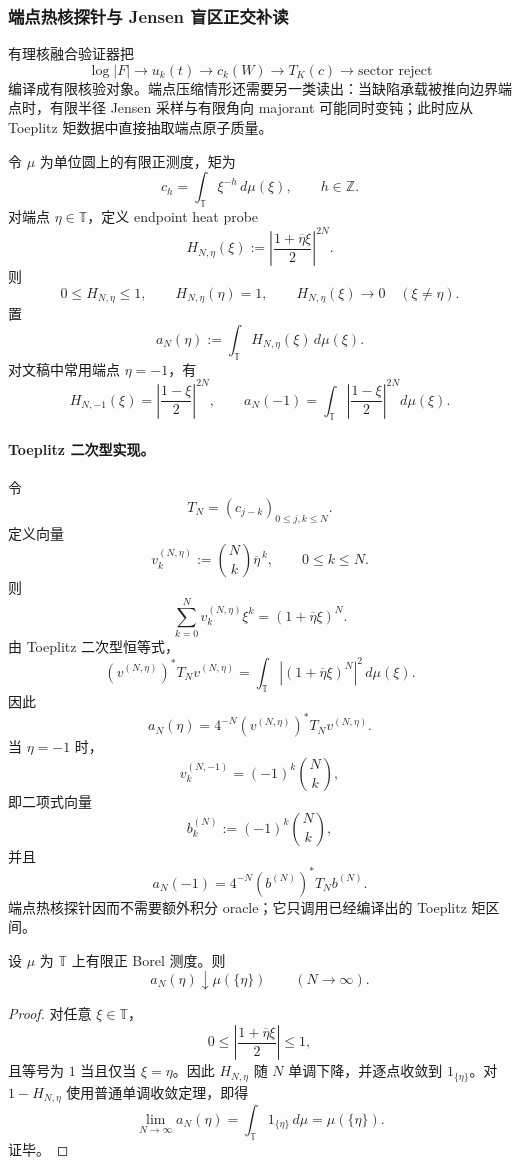 \subsubsection{端点热核探针与 Jensen 盲区正交补读}\label{subsubsec:typed-address-biaxial-completion-endpoint-heat-kernel-blindspot-complement}
有理核融合验证器把
\[
\log|F|
\longrightarrow
u_k(t)
\longrightarrow
c_k(W)
\longrightarrow
T_K(c)
\longrightarrow
\text{sector reject}
\]
编译成有限核验对象。端点压缩情形还需要另一类读出：当缺陷承载被推向边界端点时，有限半径 Jensen 采样与有限角向 majorant 可能同时变钝；此时应从 Toeplitz 矩数据中直接抽取端点原子质量。

令 \(\mu\) 为单位圆上的有限正测度，矩为
\[
c_h=\int_{\mathbb T}\xi^{-h}\,d\mu(\xi),
\qquad h\in\mathbb Z.
\]
对端点 \(\eta\in\mathbb T\)，定义 endpoint heat probe
\[
H_{N,\eta}(\xi)
:=
\left|
\frac{1+\overline{\eta}\xi}{2}
\right|^{2N}.
\]
则
\[
0\le H_{N,\eta}\le1,
\qquad
H_{N,\eta}(\eta)=1,
\qquad
H_{N,\eta}(\xi)\to0\quad(\xi\ne\eta).
\]
置
\[
a_N(\eta):=\int_{\mathbb T}H_{N,\eta}(\xi)\,d\mu(\xi).
\]
对文稿中常用端点 \(\eta=-1\)，有
\[
H_{N,-1}(\xi)
=
\left|\frac{1-\xi}{2}\right|^{2N},
\qquad
a_N(-1)
=
\int_{\mathbb T}
\left|\frac{1-\xi}{2}\right|^{2N}
d\mu(\xi).
\]

\paragraph{Toeplitz 二次型实现。}
令
\[
T_N=(c_{j-k})_{0\le j,k\le N}.
\]
定义向量
\[
v^{(N,\eta)}_k
:=
\binom Nk\overline{\eta}^{\,k},
\qquad 0\le k\le N.
\]
则
\[
\sum_{k=0}^N v^{(N,\eta)}_k\xi^k
=
(1+\overline{\eta}\xi)^N.
\]
由 Toeplitz 二次型恒等式，
\[
\left(v^{(N,\eta)}\right)^*T_Nv^{(N,\eta)}
=
\int_{\mathbb T}
\left|(1+\overline{\eta}\xi)^N\right|^2\,d\mu(\xi).
\]
因此
\[
\boxed{
a_N(\eta)
=
4^{-N}
\left(v^{(N,\eta)}\right)^*
T_N
v^{(N,\eta)}.
}
\]
当 \(\eta=-1\) 时，
\[
v^{(N,-1)}_k=(-1)^k\binom Nk,
\]
即二项式向量
\[
b^{(N)}_k:=(-1)^k\binom Nk,
\]
并且
\[
a_N(-1)=4^{-N}(b^{(N)})^*T_Nb^{(N)}.
\]
端点热核探针因而不需要额外积分 oracle；它只调用已经编译出的 Toeplitz 矩区间。

\begin{theorem}[端点热核的单调抽取]\label{thm:typed-address-biaxial-completion-endpoint-heat-monotone-extraction}
设 \(\mu\) 为 \(\mathbb T\) 上有限正 Borel 测度。则
\[
a_N(\eta)\downarrow \mu(\{\eta\})
\qquad(N\to\infty).
\]
\end{theorem}
\begin{proof}
对任意 \(\xi\in\mathbb T\)，
\[
0\le
\left|
\frac{1+\overline{\eta}\xi}{2}
\right|
\le1,
\]
且等号为 \(1\) 当且仅当 \(\xi=\eta\)。因此 \(H_{N,\eta}\) 随 \(N\) 单调下降，并逐点收敛到 \(1_{\{\eta\}}\)。对 \(1-H_{N,\eta}\) 使用普通单调收敛定理，即得
\[
\lim_{N\to\infty}a_N(\eta)
=
\int_{\mathbb T}1_{\{\eta\}}\,d\mu
=
\mu(\{\eta\}).
\]
证毕。
\end{proof}

